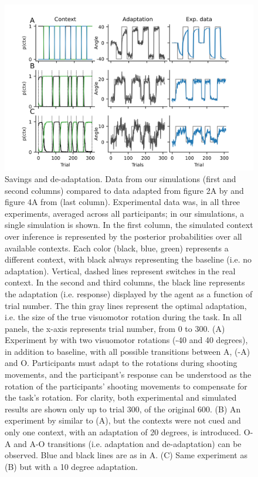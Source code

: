 \documentclass[a4paper,doc,floatsintext,natbib]{apa6}
\begin{document}
\begin{figure}
\centering
\includegraphics{./figures/figure_2.png}
\caption{Savings and de-adaptation. Data from our simulations (first and second columns) compared to data adapted from figure 2A by \cite{Kim_Neural_2015} and figure 4A from \cite{Oh_Minimizing_2019} (last column). Experimental data was, in all three experiments, averaged across all participants; in our simulations, a single simulation is shown. In the first column, the simulated context over inference is represented by the posterior probabilities over all available contexts. Each color (black, blue, green) represents a different context, with black always representing the baseline (i.e. no adaptation). Vertical, dashed lines represent switches in the real context. In the second and third columns, the black line represents the adaptation (i.e. response) displayed by the agent as a function of trial number. The thin gray lines represent the optimal adaptation, i.e. the size of the true visuomotor rotation during the task. In all panels, the x-axis represents trial number, from 0 to 300. (A) Experiment by \cite{Kim_Neural_2015} with two visuomotor rotations (-40 and 40 degrees), in addition to baseline, with all possible transitions between A, (-A) and O. Participants must adapt to the rotations during shooting movements, and the participant's response can be understood as the rotation of the participants' shooting movements to compensate for the task's rotation. For clarity, both experimental and simulated results are shown only up to trial 300, of the original 600. (B) An experiment by \cite{Oh_Minimizing_2019} similar to (A), but the contexts were not cued and only one context, with an adaptation of 20 degrees, is introduced. O-A and A-O transitions (i.e. adaptation and de-adaptation) can be observed. Blue and black lines are as in A. (C) Same experiment as (B) but with a 10 degree adaptation.}
\label{fig:oh-2019}
\end{figure}
\end{document}
